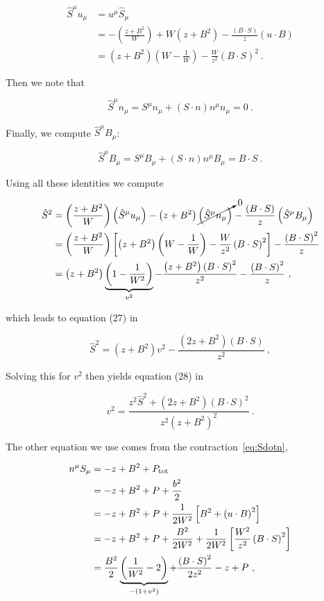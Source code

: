 \documentclass{article}
\newcommand{\BdotS}{B\cdot S}
\newcommand{\Sdotn}{S\cdot n}
\newcommand{\udotB}{u\cdot B}
\newcommand{\Ptot}{P_{\rm tot}}
\newcommand{\eq}[1]{
\begin{equation}
    #1
\end{equation}
}
\newcommand{\spl}[1]{
\eq{
\begin{split}
    #1
\end{split}
}
}
\begin{document}
\spl{
    \hat{S}^{\mu}u_{\mu} &= u^{\mu}\hat{S}_{\mu}\\
    &=-\left(\frac{z+B^{2}}{W}\right) +W\left(z+B^{2}\right)-\frac{\left(\BdotS\right)}{z}\left(\udotB\right)\\
    &= \left(z+B^{2}\right)\left(W-\frac{1}{W}\right) - \frac{W}{z^{2}}\left(\BdotS\right)^{2}\ .
}

\noindent Then we note that

\eq{
\hat{S}^{\mu}n_{\mu} = S^{\mu}n_{\mu} + \left(\Sdotn\right)n^{\mu}n_{\mu} = 0\ .
}

\noindent Finally, we compute $\hat{S}^{\mu}B_{\mu}$:

\eq{
\hat{S}^{\mu}B_{\mu} = S^{\mu}B_{\mu} + \left(\Sdotn\right)n^{\mu}B_{\mu} = \BdotS\ .
}

Using all these identities we compute

\spl{
\hat{S}^{2} &= \left(\frac{z+B^{2}}{W}\right)\left(\hat{S}^{\mu}u_{\mu}\right) - \left(z+B^{2}\right)\cancelto{0}{\left(\hat{S}^{\mu}n_{\mu}\right)} - \frac{\left(\BdotS\right)}{z}\left(\hat{S}^{\mu}B_{\mu}\right)\\
&=\left(\frac{z+B^{2}}{W}\right)\left[\left(z+B^{2}\right)\left(W-\frac{1}{W}\right) - \frac{W}{z^{2}}\left(\BdotS\right)^{2}\right] - \frac{\left(\BdotS\right)^{2}}{z}\\
&=\left(z+B^{2}\right)\underbrace{\left(1 - \frac{1}{W^{2}}\right)}_{v^{2}} - \frac{\left(z+B^{2}\right)\left(\BdotS\right)^{2}}{z^{2}} - \frac{\left(\BdotS\right)^{2}}{z}\ ,
}

\noindent which leads to equation (27) in~\cite{noble2006primitive}

\eq{
\boxed{\hat{S}^{2} = \left(z+B^{2}\right)v^{2} - \frac{\left(2z+B^{2}\right)\left(\BdotS\right)}{z^{2}}}\ ,\label{eq:Noble_Shatsquared}
}

\noindent Solving this for $v^{2}$ then yields equation (28) in~\cite{noble2006primitive}

\eq{
\boxed{v^{2} = \frac{z^{2}\hat{S}^{2} + \left(2z+B^{2}\right)\left(\BdotS\right)^{2}}{z^{2}\left(z+B^{2}\right)^{2}}}\ .\label{eq:Noble_vsq}
}

The other equation we use comes from the contraction~\eqref{eq:Sdotn},

\spl{
  n^{\mu}S_{\mu} &= -z+B^{2}+\Ptot\\
  &= -z + B^{2} + P + \frac{b^{2}}{2}\\
  &= -z + B^{2} + P + \frac{1}{2W^{2}}\left[B^{2} + \left(\udotB\right)^{2}\right]\\
  &= -z + B^{2} + P + \frac{B^{2}}{2W^{2}} + \frac{1}{2W^{2}}\left[\frac{W^{2}}{z^{2}}\left(\BdotS\right)^{2}\right]\\
  &= \frac{B^{2}}{2}\underbrace{\left(\frac{1}{W^{2}}-2\right)}_{-(1+v^{2})} + \frac{\left(\BdotS\right)^{2}}{2z^{2}} - z + P\ ,
}
\end{document}
